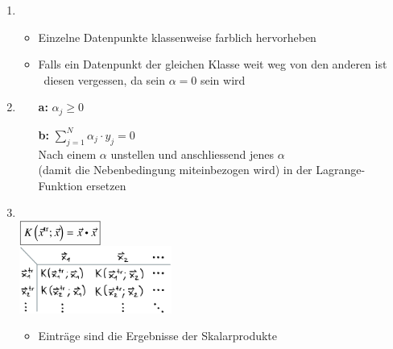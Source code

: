 
\begin{enumerate}
    \item {} \\
    \begin{minipage}[c]{0.6\columnwidth}
        \begin{itemize}
            \item Einzelne Datenpunkte klassenweise farblich hervorheben
            \item Falls ein Datenpunkt der gleichen Klasse weit weg von den anderen ist\\
            \textrightarrow\ diesen vergessen, da sein $\alpha = 0$ sein wird
        \end{itemize}
    \end{minipage}\hfill
    \begin{minipage}[c]{0.33\columnwidth}
        
    \end{minipage}
    \columnbreak
    \item {}
    \begin{itemize}
        \item [\textbf{a:}] $\boxed{\alpha_j\geq0}$
        \item [\textbf{b:}] $\boxed{\sum_{j=1}^N\alpha_j \cdot y_j=0}$\\
        Nach einem $\alpha$ unstellen und anschliessend jenes $\alpha$\\(damit die Nebenbedingung miteinbezogen wird) in der Lagrange-Funktion ersetzen
    \end{itemize}
    \item {}\\
        $\boxed{K\left( \vec{x}^{\tr} ; \vec{x}\right) = \vec{x} \dotp \vec{x}}$\\
        \includegraphics[width=5cm]{images/kernel_matrix.png}
        \begin{itemize}
            \item Einträge sind die Ergebnisse der Skalarprodukte
        \end{itemize}

\end{enumerate}
